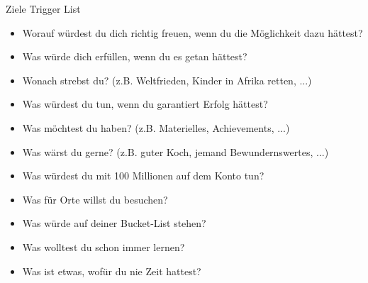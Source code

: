 \begin{frame}[c]{Ziele Trigger List}
    \footnotesize
    \begin{itemize}
        \item Worauf würdest du dich richtig freuen, wenn du die Möglichkeit dazu hättest?
        \item Was würde dich erfüllen, wenn du es getan hättest?
        \item Wonach strebst du? (z.B. Weltfrieden, Kinder in Afrika retten, ...)
        \item Was würdest du tun, wenn du garantiert Erfolg hättest?
        \item Was möchtest du haben? (z.B. Materielles, Achievements, ...)
        \item Was wärst du gerne? (z.B. guter Koch, jemand Bewundernswertes, ...)
        \item Was würdest du mit 100 Millionen auf dem Konto tun?
        \item Was für Orte willst du besuchen?
        \item Was würde auf deiner Bucket-List stehen?
        \item Was wolltest du schon immer lernen?
        \item Was ist etwas, wofür du nie Zeit hattest?
    \end{itemize}
\end{frame}



